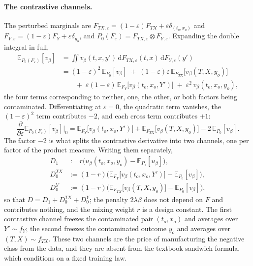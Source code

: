 \documentclass[11pt]{article}
\newcommand{\dd}{\,\mathrm{d}}
\newcommand{\Eb}{\mathbb{E}}
\begin{document}
\paragraph{The contrastive channels.}
The perturbed marginals are
$F_{TX,\varepsilon}=(1-\varepsilon)F_{TX}+\varepsilon\delta_{(t_o,x_o)}$ and
$F_{Y,\varepsilon}=(1-\varepsilon)F_Y+\varepsilon\delta_{y_o}$, and
$P_0(F_\varepsilon)=F_{TX,\varepsilon}\otimes F_{Y,\varepsilon}$. Expanding the double
integral in full,
\begin{equation}
\begin{aligned}
\Eb_{P_0(F_\varepsilon)}[v_\beta]
&= \iint v_\beta(t,x,y')\dd F_{TX,\varepsilon}(t,x)\dd F_{Y,\varepsilon}(y')\\[2pt]
&= (1-\varepsilon)^2\,\Eb_{P_0}[v_\beta]
\;+\;(1-\varepsilon)\varepsilon\,\Eb_{F_{TX}}\big[v_\beta(T,X,y_o)\big]\\
&\qquad+\;\varepsilon(1-\varepsilon)\,\Eb_{F_{Y}}\big[v_\beta(t_o,x_o,Y')\big]
\;+\;\varepsilon^2\,v_\beta(t_o,x_o,y_o),
\end{aligned}
\label{eq:p0-expanded}
\end{equation}
the four terms corresponding to neither, one, the other, or both factors being
contaminated. Differentiating at $\varepsilon=0$, the quadratic term vanishes, the
$(1-\varepsilon)^2$ term contributes $-2$, and each cross term contributes $+1$:
\begin{equation}
\frac{\partial}{\partial\varepsilon}\Eb_{P_0(F_\varepsilon)}[v_\beta]\Big|_{0}
= \Eb_{F_Y}\big[v_\beta(t_o,x_o,Y')\big]
+ \Eb_{F_{TX}}\big[v_\beta(T,X,y_o)\big]
- 2\,\Eb_{P_0}[v_\beta].
\label{eq:channel0}
\end{equation}
The factor $-2$ is what splits the contrastive derivative into two channels, one per
factor of the product measure. Writing them separately,
\begin{equation}
\begin{aligned}
D_1 &:= r\Big(u_\beta(t_o,x_o,y_o)-\Eb_{P_1}[u_\beta]\Big),\\
D_0^{TX} &:= (1-r)\Big(\Eb_{F_Y}\big[v_\beta(t_o,x_o,Y')\big]-\Eb_{P_0}[v_\beta]\Big),\\
D_0^{Y} &:= (1-r)\Big(\Eb_{F_{TX}}\big[v_\beta(T,X,y_o)\big]-\Eb_{P_0}[v_\beta]\Big),
\end{aligned}
\label{eq:channels}
\end{equation}
so that $D=D_1+D_0^{TX}+D_0^{Y}$; the penalty $2\lambda\beta$ does not depend on $F$
and contributes nothing, and the mixing weight $r$ is a design constant. The first
contrastive channel freezes the contaminated pair $(t_o,x_o)$ and averages over
$Y'\sim f_Y$; the second freezes the contaminated outcome $y_o$ and averages over
$(T,X)\sim f_{TX}$. These two channels are the price of manufacturing the negative
class from the data, and they are absent from the textbook sandwich formula, which
conditions on a fixed training law.
\end{document}
